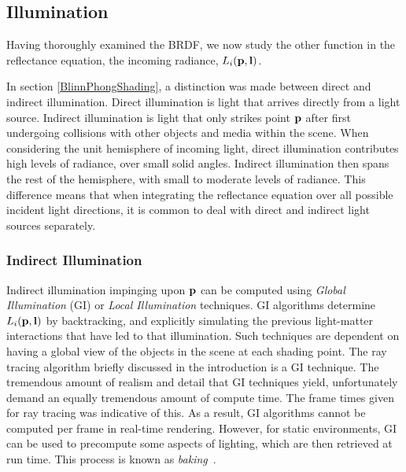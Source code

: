\subsection{Illumination} \label{Illumination}

Having thoroughly examined the BRDF, we now study the other function in the reflectance equation, the incoming radiance, \begin{math}L_i(\mathbf{p}, \mathbf{l})\end{math}.

In section \ref{BlinnPhongShading}, a distinction was made between direct and indirect illumination. Direct illumination is light that arrives directly from a light source. Indirect illumination is light that only strikes point \begin{math}\mathbf{p}\end{math} after first undergoing collisions with other objects and media within the scene. When considering the unit hemisphere of incoming light, direct illumination contributes high levels of radiance, over small solid angles. Indirect illumination then spans the rest of the hemisphere, with small to moderate levels of radiance. This difference means that when integrating the reflectance equation over all possible incident light directions, it is common to deal with direct and indirect light sources separately.

\subsubsection{Indirect Illumination}

Indirect illumination impinging upon \begin{math}\mathbf{p}\end{math} can be computed using \textit{Global Illumination} (GI) or \textit{Local Illumination} techniques. GI algorithms determine \begin{math}L_i(\mathbf{p}, \mathbf{l})\end{math} by backtracking, and explicitly simulating the previous light-matter interactions that have led to that illumination. Such techniques are dependent on having a global view of the objects in the scene at each shading point. The ray tracing algorithm briefly discussed in the introduction is a GI technique. The tremendous amount of realism and detail that GI techniques yield, unfortunately demand an equally tremendous amount of compute time. The frame times given for ray tracing was indicative of this. As a result, GI algorithms cannot be computed per frame in real-time rendering. However, for static environments, GI can be used to precompute some aspects of lighting, which are then retrieved at run time. This process is known as \textit{baking}~\cite{UberBake}.

